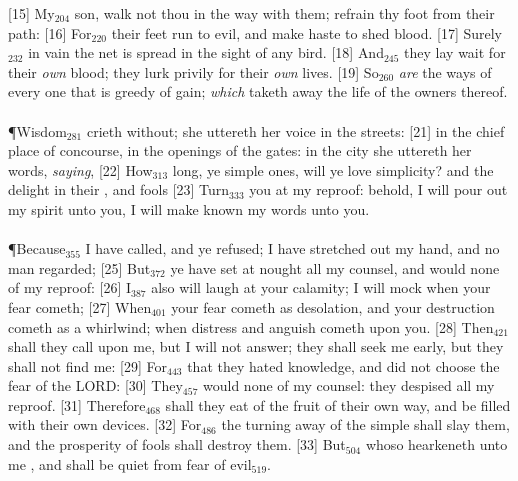 [15] \textcolor[cmyk]{0.99998,1,0,0}{My\textcolor{jungle}{$_{204}$} son, walk not thou in the way with them; refrain thy foot from their path:}
[16] \textcolor[cmyk]{0.99998,1,0,0}{For\textcolor{jungle}{$_{220}$} their feet run to evil, and make haste to shed blood.}
[17] \textcolor[cmyk]{0.99998,1,0,0}{Surely\textcolor{jungle}{$_{232}$} in vain the net is spread in the sight of any bird.}
[18] \textcolor[cmyk]{0.99998,1,0,0}{And\textcolor{jungle}{$_{245}$} they lay wait for their \emph{own} blood; they lurk privily for their \emph{own} lives.}
[19] \textcolor[cmyk]{0.99998,1,0,0}{So\textcolor{jungle}{$_{260}$} \emph{are} the ways of every one that is greedy of gain; \emph{which} taketh away the life of the owners thereof.}\\
\\
\P \textcolor[cmyk]{0.99998,1,0,0}{Wisdom\textcolor{jungle}{$_{281}$} crieth without; she uttereth her voice in the streets:}
[21] \textcolor[cmyk]{0.99998,1,0,0}{ in the chief place of concourse, in the openings of the gates: in the city she uttereth her words, \emph{saying},}
[22] \textcolor[cmyk]{0.99998,1,0,0}{How\textcolor{jungle}{$_{313}$} long, ye simple ones, will ye love simplicity? and the  delight in their , and fools }
[23] \textcolor[cmyk]{0.99998,1,0,0}{Turn\textcolor{jungle}{$_{333}$} you at my reproof: behold, I will pour out my spirit unto you, I will make known my words unto you.}\\
\\
\P \textcolor[cmyk]{0.99998,1,0,0}{Because\textcolor{jungle}{$_{355}$} I have called, and ye refused; I have stretched out my hand, and no man regarded;}
[25] \textcolor[cmyk]{0.99998,1,0,0}{But\textcolor{jungle}{$_{372}$} ye have set at nought all my counsel, and would none of my reproof:}
[26] \textcolor[cmyk]{0.99998,1,0,0}{I\textcolor{jungle}{$_{387}$} also will laugh at your calamity; I will mock when your fear cometh;}
[27] \textcolor[cmyk]{0.99998,1,0,0}{When\textcolor{jungle}{$_{401}$} your fear cometh as desolation, and your destruction cometh as a whirlwind; when distress and anguish cometh upon you.}
[28] \textcolor[cmyk]{0.99998,1,0,0}{Then\textcolor{jungle}{$_{421}$} shall they call upon me, but I will not answer; they shall seek me early, but they shall not find me:}
[29] \textcolor[cmyk]{0.99998,1,0,0}{For\textcolor{jungle}{$_{443}$} that they hated knowledge, and did not choose the fear of the LORD:}
[30] \textcolor[cmyk]{0.99998,1,0,0}{They\textcolor{jungle}{$_{457}$} would none of my counsel: they despised all my reproof.}
[31] \textcolor[cmyk]{0.99998,1,0,0}{Therefore\textcolor{jungle}{$_{468}$} shall they eat of the fruit of their own way, and be filled with their own devices.}
[32] \textcolor[cmyk]{0.99998,1,0,0}{For\textcolor{jungle}{$_{486}$} the turning away of the simple shall slay them, and the prosperity of fools shall destroy them.}
[33] \textcolor[cmyk]{0.99998,1,0,0}{But\textcolor{jungle}{$_{504}$} whoso hearkeneth unto me , and shall be quiet from fear of evil\textcolor{jungle}{$_{519}$}.}



